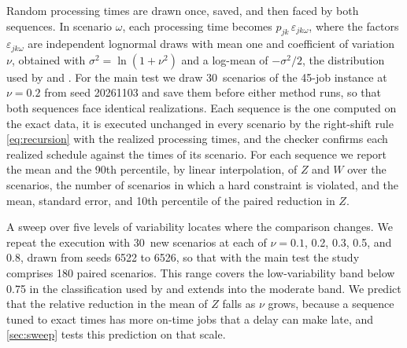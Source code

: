 \sumpara Random processing times are drawn once, saved, and then faced by both sequences. \sumparaend
\fin In scenario $\omega$, each processing time becomes $p_{jk}\,\varepsilon_{jk\omega}$, where the factors $\varepsilon_{jk\omega}$ are independent lognormal draws with mean one and coefficient of variation $\nu$, obtained with $\sigma^2 = \ln(1 + \nu^2)$ and a log-mean of $-\sigma^2/2$, the distribution used by \citet{baker2012stochastic} and \citet{framinan2015stochastic}. \fine
\fin For the main test we draw 30~scenarios of the 45-job instance at $\nu = 0.2$ from seed 20261103 and save them before either method runs, so that both sequences face identical realizations. \fine
\fin Each sequence is the one computed on the exact data, it is executed unchanged in every scenario by the right-shift rule \eqref{eq:recursion} with the realized processing times, and the checker confirms each realized schedule against the times of its scenario. \fine
\fin For each sequence we report the mean and the 90th percentile, by linear interpolation, of $Z$ and $W$ over the scenarios, the number of scenarios in which a hard constraint is violated, and the mean, standard error, and 10th percentile of the paired reduction in $Z$. \fine

\sumpara A sweep over five levels of variability locates where the comparison changes. \sumparaend
\fin We repeat the execution with 30~new scenarios at each of $\nu = 0.1$, 0.2, 0.3, 0.5, and 0.8, drawn from seeds 6522 to 6526, so that with the main test the study comprises 180 paired scenarios. \fine
\fin This range covers the low-variability band below 0.75 in the classification used by \citet{framinan2015stochastic} and extends into the moderate band. \fine
\fin We predict that the relative reduction in the mean of $Z$ falls as $\nu$ grows, because a sequence tuned to exact times has more on-time jobs that a delay can make late, and \cref{sec:sweep} tests this prediction on that scale. \fine
